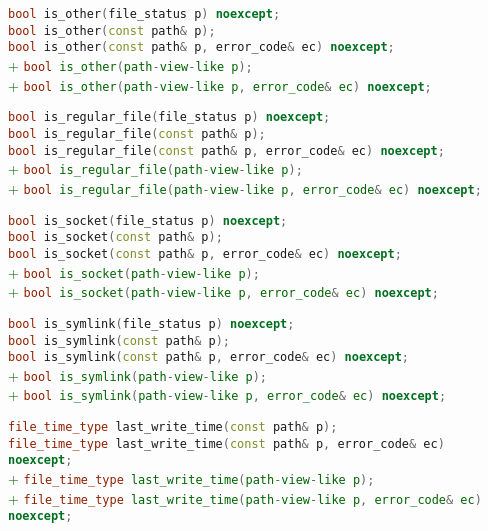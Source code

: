 \documentclass[11pt]{article}
\newcommand{\code}[2][cpp]{\lstinline[language=#1,basicstyle=\small\ttfamily]{#2}}
\newcommand{\tsreplace}[3]{\textcolor{red}{\sout{#1}}#2\textcolor{darkgreen}{#3}}
\begin{document}
\tsreplace{}{  \code{bool is_other(file_status p) noexcept;}}{}\\
\tsreplace{}{  \code{bool is_other(const path& p);}}{}\\
\tsreplace{}{  \code{bool is_other(const path& p, error_code& ec) noexcept;}}{}\\
\tsreplace{}{}{+ \code{bool is_other(path-view-like p);}}\\
\tsreplace{}{}{+ \code{bool is_other(path-view-like p, error_code& ec) noexcept;}}

\tsreplace{}{  \code{bool is_regular_file(file_status p) noexcept;}}{}\\
\tsreplace{}{  \code{bool is_regular_file(const path& p);}}{}\\
\tsreplace{}{  \code{bool is_regular_file(const path& p, error_code& ec) noexcept;}}{}\\
\tsreplace{}{}{+ \code{bool is_regular_file(path-view-like p);}}\\
\tsreplace{}{}{+ \code{bool is_regular_file(path-view-like p, error_code& ec) noexcept;}}

\tsreplace{}{  \code{bool is_socket(file_status p) noexcept;}}{}\\
\tsreplace{}{  \code{bool is_socket(const path& p);}}{}\\
\tsreplace{}{  \code{bool is_socket(const path& p, error_code& ec) noexcept;}}{}\\
\tsreplace{}{}{+ \code{bool is_socket(path-view-like p);}}\\
\tsreplace{}{}{+ \code{bool is_socket(path-view-like p, error_code& ec) noexcept;}}

\tsreplace{}{  \code{bool is_symlink(file_status p) noexcept;}}{}\\
\tsreplace{}{  \code{bool is_symlink(const path& p);}}{}\\
\tsreplace{}{  \code{bool is_symlink(const path& p, error_code& ec) noexcept;}}{}\\
\tsreplace{}{}{+ \code{bool is_symlink(path-view-like p);}}\\
\tsreplace{}{}{+ \code{bool is_symlink(path-view-like p, error_code& ec) noexcept;}}

\tsreplace{}{  \code{file_time_type last_write_time(const path& p);}}{}\\
\tsreplace{}{  \code{file_time_type last_write_time(const path& p, error_code& ec) noexcept;}}{}\\
\tsreplace{}{}{+ \code{file_time_type last_write_time(path-view-like p);}}\\
\tsreplace{}{}{+ \code{file_time_type last_write_time(path-view-like p, error_code& ec) noexcept;}}
\end{document}
